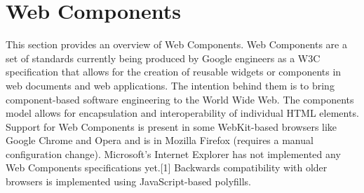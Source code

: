 \section{Web Components}
\label{sec:web_components}
This section provides an overview of Web  Components.
Web Components are a set of standards currently being produced by Google engineers as a W3C specification that allows for the creation of reusable widgets or components in web documents and web  applications.  The intention behind them is to bring component-based software engineering to the World Wide Web. The components model allows for encapsulation and interoperability of individual HTML  elements.
\newline
Support for Web Components is present in some WebKit-based browsers like Google Chrome and Opera and is in Mozilla Firefox (requires a manual configuration change). Microsoft’s Internet Explorer has not implemented any Web Components specifications yet.[1] Backwards compatibility with older browsers is implemented using JavaScript-based polyfills.\cite{tch_webcomp}

